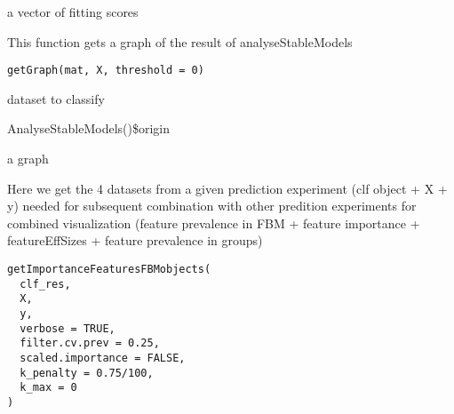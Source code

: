 \documentclass[a4paper]{book}
\begin{document}
%
\begin{Value}
a vector of fitting scores
\end{Value}
%
\begin{Description}
This function gets a graph of the result of analyseStableModels
\end{Description}
%
\begin{Usage}
\begin{verbatim}
getGraph(mat, X, threshold = 0)
\end{verbatim}
\end{Usage}
%
\begin{Arguments}
\begin{ldescription}
\item[\code{X:}] dataset to classify

\item[\code{mat:}] AnalyseStableModels()\$origin

\item[\code{threshold:}] 
\end{ldescription}
\end{Arguments}
%
\begin{Value}
a graph
\end{Value}
%
\begin{Description}
Here we get the 4 datasets from a given prediction experiment (clf object + X + y) needed for subsequent combination with other 
predition experiments for combined visualization (feature prevalence in FBM + feature importance + featureEffSizes + feature prevalence in groups)
\end{Description}
%
\begin{Usage}
\begin{verbatim}
getImportanceFeaturesFBMobjects(
  clf_res,
  X,
  y,
  verbose = TRUE,
  filter.cv.prev = 0.25,
  scaled.importance = FALSE,
  k_penalty = 0.75/100,
  k_max = 0
)
\end{verbatim}
\end{Usage}
%
\end{document}
